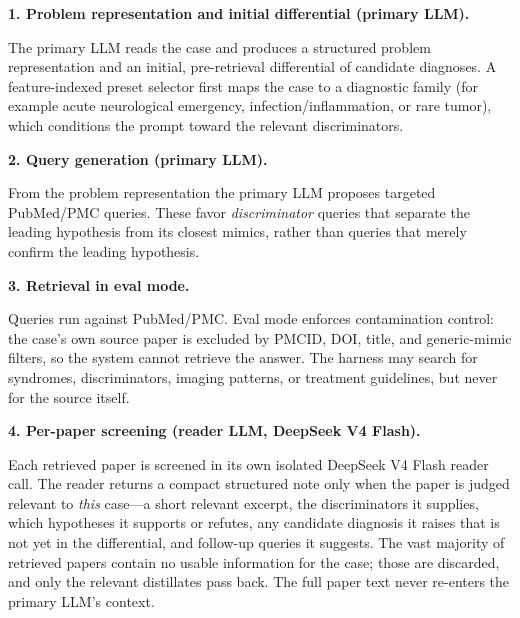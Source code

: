 \documentclass{article}
\renewcommand{\paragraph}[1]{%
  \par\addvspace{0.42\baselineskip}%
  \noindent\textbf{#1}\par\nobreak\vspace{-0.28\baselineskip}%
}
\begin{document}
\paragraph{1. Problem representation and initial differential (primary LLM).} The primary LLM reads the case
and produces a structured problem representation and an initial, pre-retrieval differential of candidate
diagnoses. A feature-indexed preset selector first maps the case to a diagnostic family (for example acute
neurological emergency, infection/inflammation, or rare tumor), which conditions the prompt toward the
relevant discriminators.

\paragraph{2. Query generation (primary LLM).} From the problem representation the primary LLM proposes
targeted PubMed/PMC queries. These favor \emph{discriminator} queries that separate the leading hypothesis
from its closest mimics, rather than queries that merely confirm the leading hypothesis.

\paragraph{3. Retrieval in eval mode.} Queries run against PubMed/PMC. Eval mode enforces contamination
control: the case's own source paper is excluded by PMCID, DOI, title, and generic-mimic filters, so the
system cannot retrieve the answer. The harness may search for syndromes, discriminators, imaging patterns,
or treatment guidelines, but never for the source itself.

\paragraph{4. Per-paper screening (reader LLM, DeepSeek V4 Flash).} Each retrieved paper is screened in its
own isolated DeepSeek V4 Flash reader call. The reader returns a compact structured note only
when the paper is judged relevant to \emph{this} case---a short relevant excerpt, the discriminators it supplies, which hypotheses it supports or
refutes, any candidate diagnosis it raises that is not yet in the differential, and follow-up queries it
suggests. The vast majority of retrieved papers contain no usable information for the case; those are
discarded, and only the relevant distillates pass back. The full paper text never re-enters the primary
LLM's context.
\end{document}
